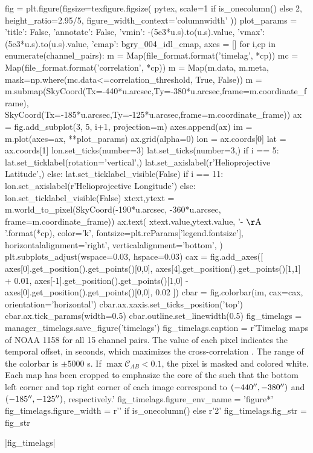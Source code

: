 \begin{pycode}
fig = plt.figure(figsize=texfigure.figsize(
    pytex,
    scale=1 if is_onecolumn() else 2,
    height_ratio=2.95/5,
    figure_width_context='columnwidth'
))
plot_params = {
    'title': False, 
    'annotate': False,
    'vmin': -(5e3*u.s).to(u.s).value,
    'vmax': (5e3*u.s).to(u.s).value,
    'cmap': bgry_004_idl_cmap,
}
axes = []
for i,cp in enumerate(channel_pairs):
    m = Map(file_format.format('timelag', *cp))
    mc = Map(file_format.format('correlation', *cp))
    m = Map(m.data, m.meta, mask=np.where(mc.data<=correlation_threshold, True, False))
    m = m.submap(SkyCoord(Tx=-440*u.arcsec,Ty=-380*u.arcsec,frame=m.coordinate_frame),
                 SkyCoord(Tx=-185*u.arcsec,Ty=-125*u.arcsec,frame=m.coordinate_frame))
    ax = fig.add_subplot(3, 5, i+1, projection=m)
    axes.append(ax)
    im = m.plot(axes=ax, **plot_params)
    ax.grid(alpha=0)
    lon = ax.coords[0]
    lat = ax.coords[1]
    lon.set_ticks(number=3)
    lat.set_ticks(number=3,) 
    if i == 5:
        lat.set_ticklabel(rotation='vertical',)
        lat.set_axislabel(r'Helioprojective Latitude',)
    else:
        lat.set_ticklabel_visible(False)
    if i == 11:
        lon.set_axislabel(r'Helioprojective Longitude')
    else:
        lon.set_ticklabel_visible(False)
    xtext,ytext = m.world_to_pixel(SkyCoord(-190*u.arcsec, -360*u.arcsec, frame=m.coordinate_frame))
    ax.text(
        xtext.value,ytext.value,
        '{}-{} $\mathrm{{\AA}}$'.format(*cp),
        color='k',
        fontsize=plt.rcParams['legend.fontsize'],
        horizontalalignment='right',
        verticalalignment='bottom',
    )
plt.subplots_adjust(wspace=0.03, hspace=0.03)
cax = fig.add_axes([
    axes[0].get_position().get_points()[0,0],
    axes[4].get_position().get_points()[1,1] + 0.01,
    axes[-1].get_position().get_points()[1,0] - axes[0].get_position().get_points()[0,0], 
    0.02
])
cbar = fig.colorbar(im, cax=cax, orientation='horizontal')
cbar.ax.xaxis.set_ticks_position('top')
cbar.ax.tick_params(width=0.5)
cbar.outline.set_linewidth(0.5)
fig_timelags = manager_timelags.save_figure('timelags')
fig_timelags.caption = r'Timelag maps of \AR{} NOAA 1158 for all 15 channel pairs. The value of each pixel indicates the temporal offset, in seconds, which maximizes the cross-correlation . The range of the colorbar is $\pm5000$ s. If $\max\mathcal{C}_{AB}<0.1$, the pixel is masked and colored white. Each map has been cropped to emphasize the core of the \AR{} such that the bottom left corner and top right corner of each image correspond to $(-440\mbox{$^{\prime\prime}$},-380\mbox{$^{\prime\prime}$})$ and $(-185\mbox{$^{\prime\prime}$},-125\mbox{$^{\prime\prime}$})$, respectively.'
fig_timelags.figure_env_name = 'figure*'
fig_timelags.figure_width = r'\columnwidth' if is_onecolumn() else r'2\columnwidth'
fig_timelags.fig_str = fig_str
\end{pycode}
|fig_timelags|

